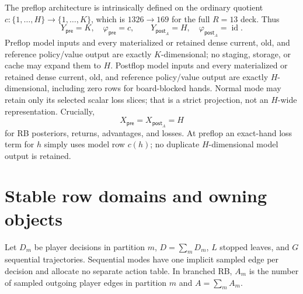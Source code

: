 \documentclass[10pt,a4paper]{article}
\begin{document}
The preflop architecture is intrinsically defined on the ordinary quotient
$c:\{1,\ldots,H\}\to\{1,\ldots,K\}$, which is $1326\to169$ for the full
$R=13$ deck.  Thus
\[
 Y_{\mathsf{pre}}=K,\quad \varphi_{\mathsf{pre}}=c,\qquad
 Y_{\mathsf{post}_A}=H,\quad\varphi_{\mathsf{post}_A}=\operatorname{id}.
\]
Preflop model inputs and every materialized or retained dense current, old, and
reference policy/value output are exactly $K$-dimensional; no staging, storage,
or cache may expand them to $H$.  Postflop model inputs and every materialized
or retained dense current, old, and reference policy/value output are exactly
$H$-dimensional, including zero rows for board-blocked hands.  Normal mode may
retain only its selected scalar loss slices; that is a strict projection, not
an $H$-wide representation.  Crucially,
\[
  X_{\mathsf{pre}}=X_{\mathsf{post}_A}=H
\]
for RB posteriors, returns, advantages, and losses.  At preflop an exact-hand
loss term for $h$ simply uses model row $c(h)$; no duplicate $H$-dimensional
model output is retained.

\section{Stable row domains and owning objects}

Let $D_m$ be player decisions in partition $m$, $D=\sum_mD_m$, $L$ stopped
leaves, and $G$ sequential trajectories.  Sequential modes have one implicit
sampled edge per decision and allocate no separate action table.  In branched
RB, $A_m$ is the number of sampled outgoing player edges in partition $m$ and
$A=\sum_mA_m$.
\end{document}
